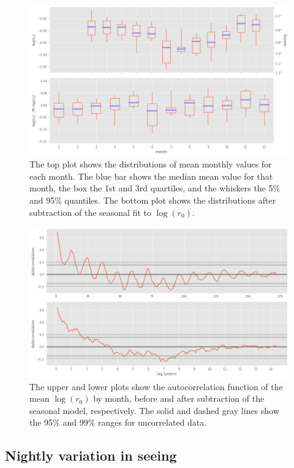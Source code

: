 \documentclass[DM,authoryear,toc]{lsstdoc}
\begin{document}
\begin{figure}
  \includegraphics[width=\columnwidth]{./figures/monthly_boxplot.png}
  \caption{The top plot shows the distributions of mean monthly values
    for each month. The blue bar shows the median mean value for that
    month, the box the 1st and 3rd quartiles, and the whiskers the
    5\% and 95\% quantiles. The bottom plot shows the distributions after
    subtraction of the seasonal fit to $\log(r_0)$.}
  \label{fig:monthly-boxplot}
\end{figure}

\begin{figure}
  \includegraphics[width=\columnwidth]{./figures/seasonal_sub_autocorr.png}
  \caption{The upper and lower plots show the autocorrelation function
  of the mean $\log(r_0)$ by month, before and after subtraction of
  the seasonal model, respectively. The solid and dashed gray lines show
  the 95\% and 99\% ranges for uncorrelated data.}
  \label{fig:seasonal-sub-autocorr}
\end{figure}

\subsection{Nightly variation in seeing}
\label{sec:nightly-variation}
\end{document}
